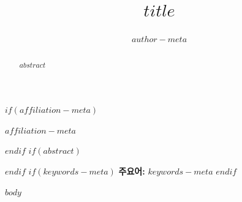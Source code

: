 \documentclass[$classoptions$]{oblivoir}
\title{$title$}
\author{$author-meta$}
\date{}
\begin{document}
\maketitle
$if(affiliation-meta)$
\begin{center}
$affiliation-meta$
\end{center}
$endif$
$if(abstract)$
\begin{abstract}
$abstract$
\end{abstract}
$endif$
$if(keywords-meta)$
\noindent\textbf{주요어:} $keywords-meta$
$endif$

$body$
\end{document}
